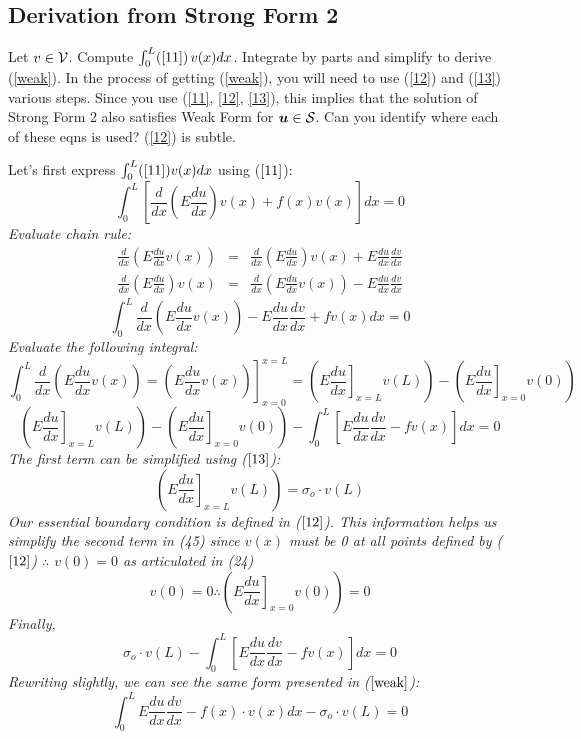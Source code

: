 \documentclass[12pt,american]{article}
\def\beq{\begin{equation}}
\def\eeq{\end{equation}}
\def\bea{\begin{eqnarray}}
\def\eea{\end{eqnarray}}
\def \u{\mbox{\boldmath{$u$}}}
\def \sigo{\sigma_{o}}
\def \cS{{\cal{S}}}
\def \cV{{\cal{V}}}
\begin{document}
\subsection{Derivation from Strong Form 2}
\begin{tcolorbox}[title= Exercise: Derive the weak form from the strong form] 
Let $v \in \cV$.  Compute $\int_0^L (\ref{11})\,  v(x) dx$.  
Integrate by parts and simplify to derive (\ref{weak}).  
In the process of getting (\ref{weak}), you will need to use (\ref{12}) and (\ref{13}) 
various steps.  Since you use (\ref{11}, \ref{12}, \ref{13}), this implies that the 
solution of Strong Form 2 also satisfies Weak Form for $\u \in \cS$.  
Can you identify where each of these eqns is used? 
(\ref{12}) is subtle.
\end{tcolorbox}
Let's first express $\int_0^L(\ref{11})v(x)dx$ using ($\ref{11}$):
\beq
\int_0^L \left[ \frac{d}{dx} \left( E \frac{du}{dx} \right) v(x) + f(x)v(x) \right]dx = 0
\eeq
{\em Evaluate chain rule:}
\bea
\frac{d}{dx} \left( E \frac{du}{dx} v(x) \right) &=&
\frac{d}{dx} \left( E \frac{du}{dx} \right) v(x) +
E \frac{du}{dx} \frac{dv}{dx} \\
\frac{d}{dx} \left( E \frac{du}{dx} \right) v(x) &=&
\frac{d}{dx} \left( E \frac{du}{dx} v(x) \right) -
E \frac{du}{dx} \frac{dv}{dx}
\eea
\beq
\int_0^L \frac{d}{dx} \left( E \frac{du}{dx} v(x) \right) - E \frac{du}{dx} \frac{dv}{dx} + fv(x) dx = 0
\eeq
{\em Evaluate the following integral:}
\beq
\int_0^L \frac{d}{dx} \left( E \frac{du}{dx} v(x) \right) = \left. \left( E \frac{du}{dx} v(x) \right) \right]_{x=0}^{x=L} = 
\left( \left. E \frac{du}{dx} \right]_{x=L} v(L) \right) - 
\left( \left. E \frac{du}{dx} \right]_{x=0} v(0) \right)
\eeq
\beq
\left( \left. E \frac{du}{dx} \right]_{x=L} v(L) \right) - 
\left( \left. E \frac{du}{dx} \right]_{x=0} v(0) \right) - 
\int_0^L \left[ E \frac{du}{dx} \frac{dv}{dx} - fv(x) \right] dx = 0
\eeq
{\em The first term can be simplified using ($\ref{13}$):}
\beq
\left( \left. E \frac{du}{dx} \right]_{x=L} v(L) \right) = 
\sigo \cdot v(L)
\eeq
{\em Our essential boundary condition is defined in ($\ref{12}$). This information helps us simplify the second term in (45) since $v(x)$ must be 0 at all points defined by ($\ref{12}$) $\therefore$ $v(0) = 0$ as articulated in (24)}
\beq
v(0) = 0 \therefore \left( \left. E \frac{du}{dx} \right]_{x=0} v(0) \right) = 0
\eeq
{\em Finally,}
\beq
\sigo \cdot v(L) - \int_0^L \left[ E \frac{du}{dx} \frac{dv}{dx} - fv(x) \right] dx = 0
\eeq
{\em Rewriting slightly, we can see the same form presented in ($\ref{weak}$):}
\beq
\int_0^L E \frac{du}{dx} \frac{dv}{dx} - 
f(x) \cdot v(x) dx -
\sigo \cdot v(L) = 0
\eeq
\end{document}
